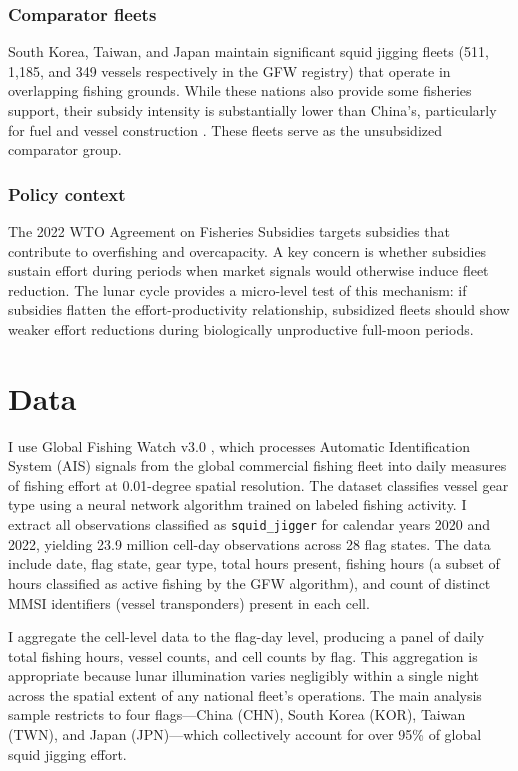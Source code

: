 \documentclass[12pt]{article}
\begin{document}
\subsubsection*{Comparator fleets} South Korea, Taiwan, and Japan maintain significant squid jigging fleets (511, 1,185, and 349 vessels respectively in the GFW registry) that operate in overlapping fishing grounds. While these nations also provide some fisheries support, their subsidy intensity is substantially lower than China's, particularly for fuel and vessel construction \citep{sumaila2019}. These fleets serve as the unsubsidized comparator group.

\subsubsection*{Policy context} The 2022 WTO Agreement on Fisheries Subsidies \citep{wto2022} targets subsidies that contribute to overfishing and overcapacity. A key concern is whether subsidies sustain effort during periods when market signals would otherwise induce fleet reduction. The lunar cycle provides a micro-level test of this mechanism: if subsidies flatten the effort-productivity relationship, subsidized fleets should show weaker effort reductions during biologically unproductive full-moon periods.


\section{Data}
\label{sec:data}

I use Global Fishing Watch v3.0 \citep{kroodsma2018}, which processes Automatic Identification System (AIS) signals from the global commercial fishing fleet into daily measures of fishing effort at 0.01-degree spatial resolution. The dataset classifies vessel gear type using a neural network algorithm trained on labeled fishing activity. I extract all observations classified as \texttt{squid\_jigger} for calendar years 2020 and 2022, yielding 23.9 million cell-day observations across 28 flag states. The data include date, flag state, gear type, total hours present, fishing hours (a subset of hours classified as active fishing by the GFW algorithm), and count of distinct MMSI identifiers (vessel transponders) present in each cell.

I aggregate the cell-level data to the flag-day level, producing a panel of daily total fishing hours, vessel counts, and cell counts by flag. This aggregation is appropriate because lunar illumination varies negligibly within a single night across the spatial extent of any national fleet's operations. The main analysis sample restricts to four flags---China (CHN), South Korea (KOR), Taiwan (TWN), and Japan (JPN)---which collectively account for over 95\% of global squid jigging effort.
\end{document}
